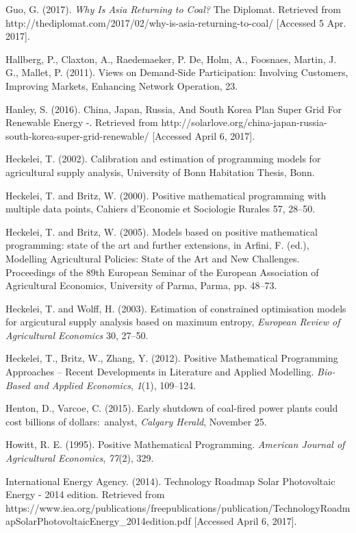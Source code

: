 \documentclass[10pt,letter]{article}
\begin{document}
Guo, G. (2017). \emph{Why Is Asia Returning to Coal?} The Diplomat.
Retrieved from
http://thediplomat.com/2017/02/why-is-asia-returning-to-coal/
{[}Accessed 5 Apr. 2017{]}.

Hallberg, P., Claxton, A., Raedemaeker, P. De, Holm, A., Foosnaes,
Martin, J. G., Mallet, P. (2011). Views on Demand-Side Participation:
Involving Customers, Improving Markets, Enhancing Network Operation, 23.

Hanley, S. (2016). China, Japan, Russia, And South Korea Plan Super Grid
For Renewable Energy -. Retrieved from
http://solarlove.org/china-japan-russia-south-korea-super-grid-renewable/
{[}Accessed April 6, 2017{]}.

Heckelei, T. (2002). Calibration and estimation of programming models
for agricultural supply analysis, University of Bonn Habitation Thesis,
Bonn.

Heckelei, T. and Britz, W. (2000). Positive mathematical programming
with multiple data points, Cahiers d'Economie et Sociologie Rurales 57,
28--50.

Heckelei, T. and Britz, W. (2005). Models based on positive mathematical
programming: state of the art and further extensions, in Arfini, F.
(ed.), Modelling Agricultural Policies: State of the Art and New
Challenges. Proceedings of the 89th European Seminar of the European
Association of Agricultural Economics, University of Parma, Parma, pp.
48--73.

Heckelei, T. and Wolff, H. (2003). Estimation of constrained
optimisation models for argicutural supply analysis based on maximum
entropy, \emph{European Review of Agricultural Economics} 30, 27--50.

Heckelei, T., Britz, W., Zhang, Y. (2012). Positive Mathematical
Programming Approaches -- Recent Developments in Literature and Applied
Modelling. \emph{Bio-Based and Applied Economics}, \emph{1}(1),
109--124.

Henton, D., Varcoe, C. (2015). Early shutdown of coal-fired power plants
could cost billions of dollars:~analyst, \emph{Calgary Herald}, November
25.

Howitt, R. E. (1995). Positive Mathematical Programming. \emph{American
Journal of Agricultural Economics}, \emph{77}(2), 329.

International Energy Agency. (2014). Technology Roadmap Solar
Photovoltaic Energy - 2014 edition. Retrieved from
https://www.iea.org/publications/freepublications/publication/TechnologyRoadmapSolarPhotovoltaicEnergy\_2014edition.pdf
{[}Accessed April 6, 2017{]}.
\end{document}

